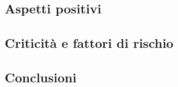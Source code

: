 \subsection{Aspetti positivi}

\subsection{Criticità e fattori di rischio}

\subsection{Conclusioni}
